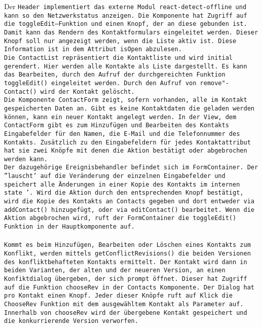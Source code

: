 %
Der \tt{Header} implementiert das externe Modul \tt{react-detect-offline} und kann so den Netzwerkstatus anzeigen. Die Komponente hat Zugriff auf die \tt{toggleEdit}--Funktion und einen Knopf, der an diese gebunden ist. Damit kann das Rendern des Kontaktformulars eingeleitet werden.
Dieser Knopf soll nur angezeigt werden, wenn die Liste aktiv ist. Diese Information ist in dem  Attribut \tt{isOpen} abzulesen.\\
Die \tt{ContactList} repräsentiert die Kontaktliste und wird initial gerendert. Hier werden alle Kontakte als Liste dargestellt.
Es kann das Bearbeiten, durch den Aufruf der durchgereichten Funktion \tt{toggleEdit()} eingeleitet werden. Durch den Aufruf von \tt{remove"-Contact()} wird der Kontakt gelöscht.\\
%
Die Komponente \tt{ContactForm} zeigt, sofern vorhanden, alle im Kontakt gespeicherten Daten an.
Gibt es keine Kontaktdaten die geladen werden können, kann ein neuer Kontakt angelegt werden.
In der View, dem \tt{ContactForm} gibt es zum Hinzufügen und Bearbeiten des Kontakts Eingabefelder für den Namen, die E-Mail und die Telefonnummer des Kontakts.
Zusätzlich zu den Eingabefeldern für jedes Kontaktattribut hat sie zwei Knöpfe mit denen die Aktion bestätigt oder abgebrochen werden kann.\\
Der dazugehörige Ereignisbehandler befindet sich im \tt{FormContainer}. 
Der ''lauscht' auf die Veränderung der einzelnen Eingabefelder und speichert alle Änderungen in einer Kopie des Kontakts im internen \tt{state} '.
Wird die Aktion durch den entsprechenden Knopf bestätigt, wird die Kopie des Kontakts an \tt{Contacts} gegeben und dort entweder via \tt{addContact()} hinzugefügt, oder via \tt{editContact()} bearbeitet.
Wenn die Aktion abgebrochen wird, ruft der \tt{FormContainer} die \tt{toggleEdit()} Funktion in der Hauptkomponente auf.\\\\
%
%
Kommt es beim Hinzufügen, Bearbeiten oder Löschen eines Kontakts zum Konflikt, werden mittels \tt{getConflictRevisions()} die beiden Versionen des konfliktbehafteten Kontakts ermittelt.
Der Kontakt wird dann in beiden Varianten, der alten und der neueren Version, an einen Konfiktdialog übergeben, der sich prompt öffnet. Dieser hat Zugriff auf die Funktion \tt{chooseRev} in der \tt{Contacts} Komponente. Der Dialog hat pro Kontakt einen Knopf. Jeder dieser Knöpfe ruft auf Klick die \tt{ChooseRev} Funktion mit dem ausgewähltem Kontakt als Parameter auf.
Innerhalb von \tt{chooseRev} wird der übergebene Kontakt gespeichert und die konkurrierende Version verworfen.\\\\
